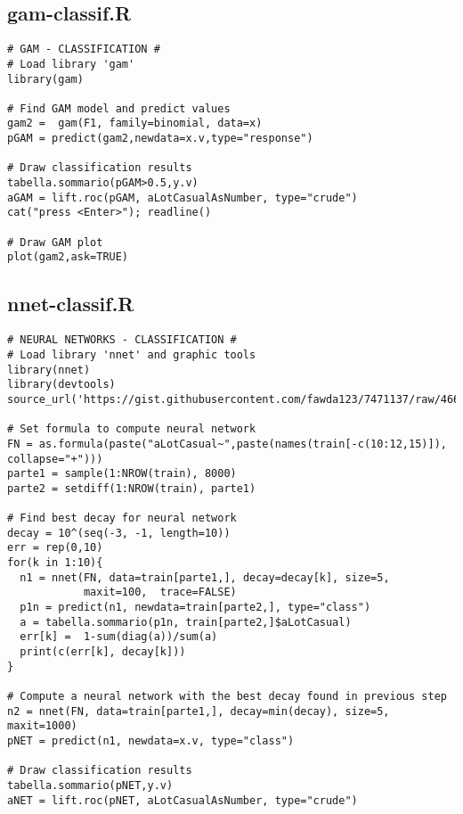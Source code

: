 \subsection{gam-classif.R}\label{sec:script-gam-classif}
\begin{verbatim}
# GAM - CLASSIFICATION #
# Load library 'gam'
library(gam)

# Find GAM model and predict values
gam2 =  gam(F1, family=binomial, data=x)
pGAM = predict(gam2,newdata=x.v,type="response")

# Draw classification results
tabella.sommario(pGAM>0.5,y.v)
aGAM = lift.roc(pGAM, aLotCasualAsNumber, type="crude")
cat("press <Enter>"); readline()

# Draw GAM plot
plot(gam2,ask=TRUE)
\end{verbatim}

\subsection{nnet-classif.R}\label{sec:script-nnet-classif}
\begin{verbatim}
# NEURAL NETWORKS - CLASSIFICATION #
# Load library 'nnet' and graphic tools
library(nnet)
library(devtools)
source_url('https://gist.githubusercontent.com/fawda123/7471137/raw/466c1474d0a505ff044412703516c34f1a4684a5/nnet_plot_update.r')

# Set formula to compute neural network
FN = as.formula(paste("aLotCasual~",paste(names(train[-c(10:12,15)]), collapse="+")))
parte1 = sample(1:NROW(train), 8000) 
parte2 = setdiff(1:NROW(train), parte1)

# Find best decay for neural network
decay = 10^(seq(-3, -1, length=10))
err = rep(0,10)
for(k in 1:10){
  n1 = nnet(FN, data=train[parte1,], decay=decay[k], size=5,
            maxit=100,  trace=FALSE)
  p1n = predict(n1, newdata=train[parte2,], type="class")
  a = tabella.sommario(p1n, train[parte2,]$aLotCasual)
  err[k] =  1-sum(diag(a))/sum(a)
  print(c(err[k], decay[k]))
}

# Compute a neural network with the best decay found in previous step
n2 = nnet(FN, data=train[parte1,], decay=min(decay), size=5,  maxit=1000)
pNET = predict(n1, newdata=x.v, type="class")

# Draw classification results
tabella.sommario(pNET,y.v)
aNET = lift.roc(pNET, aLotCasualAsNumber, type="crude")
\end{verbatim}

